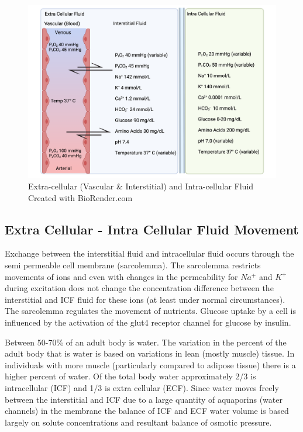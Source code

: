 \begin{figure}[!h]
    \centering
    \includegraphics[width=1\linewidth]{./figure/ecf.png}
    \caption{Extra-cellular (Vascular \& Interstitial) and Intra-cellular Fluid \footnotesize{Created with BioRender.com}}
    \label{fig:ecf}
\end{figure}

\subsection{Extra Cellular - Intra Cellular Fluid Movement}

Exchange between the interstitial fluid and intracellular fluid occurs through the semi permeable cell membrane (sarcolemma). The sarcolemma restricts movements of ions and even with changes in the permeability for $Na^+$ and $K^+$ during excitation does not change the concentration difference between the interstitial and ICF fluid for these ions (at least under normal circumstances). The sarcolemma regulates the movement of nutrients.  Glucose uptake by a cell is influenced by the activation of the glut4 receptor channel for glucose by insulin. 

Between 50-70\% of an adult body is water. The variation in the percent of the adult body that is water is based on variations in lean (mostly muscle) tissue. In individuals with more muscle (particularly compared to adipose tissue) there is a higher percent of water. Of the total body water approximately 2/3 is intracellular (ICF) and 1/3 is extra cellular (ECF). Since water moves freely between the interstitial and ICF due to a large quantity of aquaporins (water channels) in the membrane the balance of ICF and ECF water volume is based largely on solute concentrations and resultant balance of osmotic pressure.

